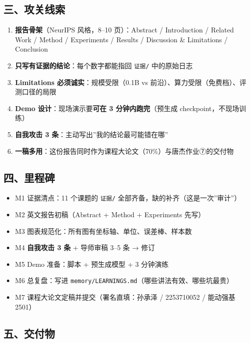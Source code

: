\documentclass[
  chinese,
  11pt,
]{ctexart}
\providecommand{\tightlist}{%
  \setlength{\itemsep}{0pt}\setlength{\parskip}{0pt}}
\begin{document}
\subsection{三、攻关线索}\label{ux4e09ux653bux5173ux7ebfux7d22-9}

\begin{enumerate}
\def\labelenumi{\arabic{enumi}.}
\tightlist
\item
  \textbf{报告骨架}（NeurIPS 风格，8--10 页）：Abstract / Introduction / Related Work / Method / Experiments / Results / Discussion \& Limitations / Conclusion
\item
  \textbf{只写有证据的结论}：每个数字都能指回 \texttt{证据/} 中的原始日志
\item
  \textbf{Limitations 必须诚实}：规模受限（0.1B vs 前沿）、算力受限（免费档）、评测口径的局限
\item
  \textbf{Demo 设计}：现场演示要\textbf{可在 3 分钟内跑完}（预生成 checkpoint，不现场训练）
\item
  \textbf{自我攻击 3 条}：主动写出''我的结论最可能错在哪''
\item
  \textbf{一稿多用}：这份报告同时作为课程大论文（70\%）与唐杰作业⑦的交付物
\end{enumerate}

\subsection{四、里程碑}\label{ux56dbux91ccux7a0bux7891-9}

\begin{itemize}
\tightlist
\item[$\square$]
  M1 证据清点：11 个课题的 \texttt{证据/} 全部齐备，缺的补齐（这是一次''审计''）
\item[$\square$]
  M2 英文报告初稿（Abstract + Method + Experiments 先写）
\item[$\square$]
  M3 图表规范化：所有图有坐标轴、单位、误差棒、样本数
\item[$\square$]
  M4 \textbf{自我攻击 3 条} + 导师审稿 3--5 条 → 修订
\item[$\square$]
  M5 Demo 准备：脚本 + 预生成模型 + 3 分钟演练
\item[$\square$]
  M6 总复盘：写进 \texttt{memory/LEARNINGS.md}（哪些讲法有效、哪些坑最贵）
\item[$\square$]
  M7 课程大论文定稿并提交（署名直填：孙承泽 / 2253710052 / 能动强基2501）
\end{itemize}

\subsection{五、交付物}\label{ux4e94ux4ea4ux4ed8ux7269-9}
\end{document}
